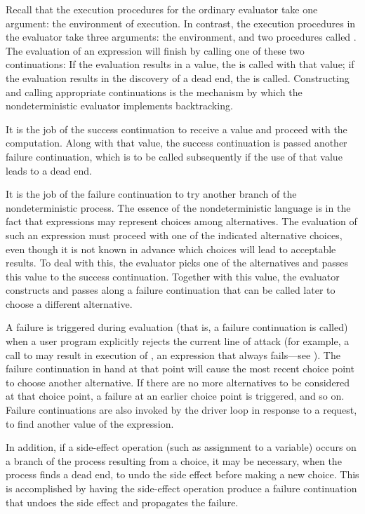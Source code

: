 Recall that the execution procedures for the ordinary evaluator take one
argument: the environment of execution.  In contrast, the execution procedures
in the  evaluator take three arguments: the environment, and two
procedures called .  The evaluation of an
expression will finish by calling one of these two continuations: If the
evaluation results in a value, the  is called
with that value; if the evaluation results in the discovery of a dead end, the
 is called.  Constructing and calling appropriate
continuations is the mechanism by which the nondeterministic evaluator
implements backtracking.

It is the job of the success continuation to receive a value and proceed with
the computation.  Along with that value, the success continuation is passed
another failure continuation, which is to be called subsequently if the use of
that value leads to a dead end.

It is the job of the failure continuation to try another branch of the
nondeterministic process.  The essence of the nondeterministic language is in
the fact that expressions may represent choices among alternatives.  The
evaluation of such an expression must proceed with one of the indicated
alternative choices, even though it is not known in advance which choices will
lead to acceptable results.  To deal with this, the evaluator picks one of the
alternatives and passes this value to the success continuation.  Together with
this value, the evaluator constructs and passes along a failure continuation
that can be called later to choose a different alternative.

A failure is triggered during evaluation (that is, a failure continuation is
called) when a user program explicitly rejects the current line of attack (for
example, a call to  may result in execution of , an
expression that always fails---see ).  The failure
continuation in hand at that point will cause the most recent choice point to
choose another alternative.  If there are no more alternatives to be considered
at that choice point, a failure at an earlier choice point is triggered, and so
on.  Failure continuations are also invoked by the driver loop in response to a
 request, to find another value of the expression.

In addition, if a side-effect operation (such as assignment to a variable)
occurs on a branch of the process resulting from a choice, it may be necessary,
when the process finds a dead end, to undo the side effect before making a new
choice.  This is accomplished by having the side-effect operation produce a
failure continuation that undoes the side effect and propagates the failure.

